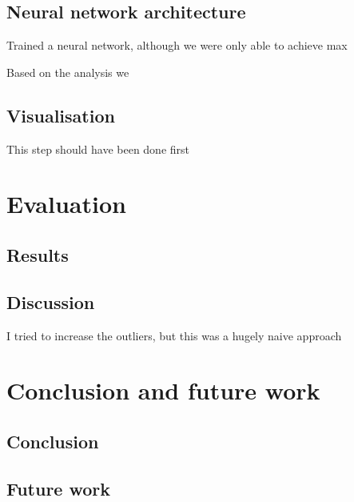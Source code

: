 

\section{Neural network architecture}
Trained a neural network, although we were only able to achieve max

Based on the analysis we

\section{Visualisation}
This step should have been done first

\chapter{Evaluation}

\section{Results}

\section{Discussion}
I tried to increase the outliers, but this was a hugely naive approach

\chapter{Conclusion and future work}

\section{Conclusion}

\section{Future work}

